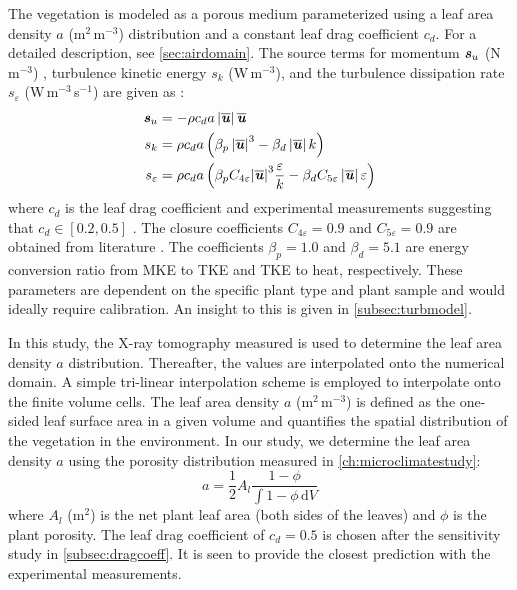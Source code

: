 The vegetation is modeled as a porous medium parameterized using a leaf area density $a$ (m$^2$\,m$^{-3}$) distribution and a constant leaf drag coefficient $c_d$. For a detailed description, see \cref{sec:airdomain}. The source terms for momentum $\textbf{\textit{s}}_u$ (N\,m$^{-3}$) , turbulence kinetic energy $s_k$ (W\,m$^{-3}$), and the turbulence dissipation rate $s_{\varepsilon}$ (W\,m$^{-3}$\,s$^{-1}$) are given as \citep{Katul2004, Kenjeres2013, Sanz2003}:
	\begin{align}
		\textbf{\textit{s}}_u &=  - \rho {c_d}a\left| \overline{\textbf{\textit{u}}} \right|\overline{\textbf{\textit{u}}} 	\label{eq:source_veg1}	 \\
		s_k &= \rho {c_d}a\left( \beta _p \left| \overline{\textbf{\textit{u}}} \right|^3 - \beta _d\left| \overline{\textbf{\textit{u}}} \right|k \right) \label{eq:source_veg2} \\
		s_\varepsilon &= \rho {c_d}a\left( {{\beta _p}{C_{4\varepsilon }}{{\left| \overline{\textbf{\textit{u}}} \right|}^3}\frac{\varepsilon }{k} - {\beta _d}{C_{5\varepsilon }}\left| \overline{\textbf{\textit{u}}} \right|\varepsilon } \right)
		\label{eq:source_veg3}
	\end{align}
where $c_d$ is the leaf drag coefficient \citep{Wilson1977} and experimental measurements suggesting that $c_d \in \left[0.2, 0.5\right]$ \citep{Vogel1989}. The closure coefficients $C_{4\varepsilon}=0.9$ and $C_{5\varepsilon}=0.9$ are obtained from literature \citep{Katul2004, Kenjeres2013, Sanz2003}. The coefficients $\beta_p=1.0$ and $\beta_d=5.1$ are energy conversion ratio from MKE to TKE and TKE to heat, respectively. These parameters are dependent on the specific plant type and plant sample and would ideally require calibration. An insight to this is given in \cref{subsec:turbmodel}.

In this study, the X-ray tomography measured is used to determine the leaf area density $a$ distribution. Thereafter, the values are interpolated onto the numerical domain. A simple tri-linear interpolation scheme is employed to interpolate onto the finite volume cells. The leaf area density $a$ (m$^2$\,m$^{-3}$) is defined as the one-sided leaf surface area in a given volume and quantifies the spatial distribution of the vegetation in the environment. In our study, we determine the leaf area density $a$ using the porosity distribution measured in \cref{ch:microclimatestudy}: 
	\begin{equation}
	a = \frac{1}{2} A_l \frac{1 - \phi}{\int {1 - \phi }\,\mathrm{d}V}
	\label{eq:leafdensitywteq}
	\end{equation}
where $A_l$ (m$^{2}$) is the net plant leaf area (both sides of the leaves) and $\phi$ is the plant porosity. The leaf drag coefficient of $c_d = 0.5$ is chosen after the sensitivity study in \cref{subsec:dragcoeff}. It is seen to provide the closest prediction with the experimental measurements.

